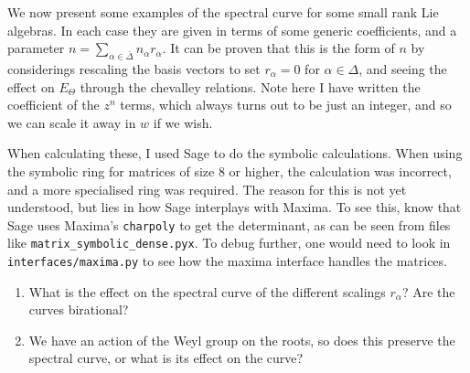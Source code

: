 \documentclass{article}
\begin{document}
We now present some examples of the spectral curve for some small rank Lie algebras. In each case they are given in terms of some generic coefficients, and a parameter $n = \sum_{\alpha \in \bar{\Delta}} n_\alpha r_\alpha$. It can be proven that this is the form of $n$ by considerings rescaling the basis vectors to set $r_\alpha=0$ for $\alpha \in \Delta$, and seeing the effect on $E_{\Theta}$ through the chevalley relations.  
Note here I have written the coefficient of the $z^n$ terms, which always turns out to be just an integer, and so we can scale it away in $w$ if we wish. 
\begin{remark}
	When calculating these, I used Sage to do the symbolic calculations. When using the symbolic ring for matrices of size 8 or higher, the calculation was incorrect, and a more specialised ring was required. The reason for this is not yet understood, but lies in how Sage interplays with Maxima. To see this, know that Sage uses Maxima's \texttt{charpoly} to get the determinant, as can be seen from files like \texttt{matrix\_symbolic\_dense.pyx}. To debug further, one would need to look in \texttt{interfaces/maxima.py} to see how the maxima interface handles the matrices. 
\end{remark}
\begin{enumerate}
	\item What is the effect on the spectral curve of the different scalings $r_\alpha$? Are the curves birational?
	\item We have an action of the Weyl group on the roots, so does this preserve the spectral curve, or what is its effect on the curve? 
\end{enumerate}
\end{document}
